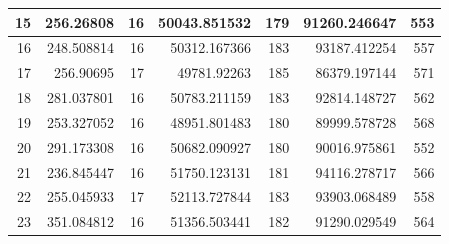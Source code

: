 \begin{table}
\begin{adjustwidth}{}{}
{{\begin{tabular}{|r|r|r|r|r|r|r|}
	\hline
	15                                         & 256.26808                    & 16                                    & 50043.851532                   & 179                                   & 91260.246647                 & 553                                    \\ 
	\hline
	16                                         & 248.508814                   & 16                                    & 50312.167366                   & 183                                   & 93187.412254                 & 557                                    \\ 
	\hline
	17                                         & 256.90695                    & 17                                    & 49781.92263                    & 185                                   & 86379.197144                 & 571                                    \\ 
	\hline
	18                                         & 281.037801                   & 16                                    & 50783.211159                   & 183                                   & 92814.148727                 & 562                                    \\ 
	\hline
	19                                         & 253.327052                   & 16                                    & 48951.801483                   & 180                                   & 89999.578728                 & 568                                    \\ 
	\hline
	20                                         & 291.173308                   & 16                                    & 50682.090927                   & 180                                   & 90016.975861                 & 552                                    \\ 
	\hline
	21                                         & 236.845447                   & 16                                    & 51750.123131                   & 181                                   & 94116.278717                 & 566                                    \\ 
	\hline
	22                                         & 255.045933                   & 17                                    & 52113.727844                   & 183                                   & 93903.068489                 & 558                                    \\ 
	\hline
	23                                         & 351.084812                   & 16                                    & 51356.503441                   & 182                                   & 91290.029549                 & 564                                    \\ 

\end{tabular}}}
\end{adjustwidth}
\end{table}
